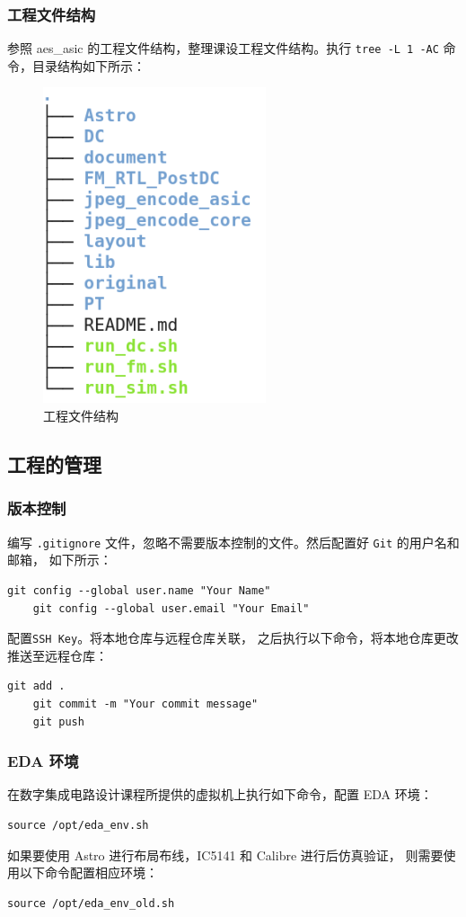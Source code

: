 \documentclass[12pt,hyperref,a4paper,UTF8]{ctexart}
\begin{document}
\subsubsection{工程文件结构}
参照 aes\_asic 的工程文件结构，整理课设工程文件结构。执行 
\texttt{tree -L 1 -AC} 命令，目录结构如下所示：
\begin{figure}[htbp]
    \centering
    \includegraphics[width =.25\textwidth]{figures/tree.png}
    \caption{工程文件结构}
    \label{tree}
\end{figure}

\subsection{工程的管理}
\subsubsection{版本控制}
编写 \texttt{.gitignore} 文件，忽略不需要版本控制的文件。然后配置好
\texttt{Git} 的用户名和邮箱， 如下所示：
\begin{lstlisting}[style=bashstyle]
    git config --global user.name "Your Name"
    git config --global user.email "Your Email"
\end{lstlisting}

配置\texttt{SSH Key}。将本地仓库与远程仓库关联，
之后执行以下命令，将本地仓库更改推送至远程仓库：
\begin{lstlisting}[style=bashstyle]
    git add .
    git commit -m "Your commit message"
    git push
\end{lstlisting}

\subsubsection{EDA 环境}
在数字集成电路设计课程所提供的虚拟机上执行如下命令，配置 EDA 环境：
\begin{lstlisting}[style=bashstyle]
    source /opt/eda_env.sh
\end{lstlisting}

如果要使用 Astro 进行布局布线，IC5141 和 Calibre 进行后仿真验证，
则需要使用以下命令配置相应环境：
\begin{lstlisting}[style=bashstyle]
    source /opt/eda_env_old.sh
\end{lstlisting}
\end{document}
